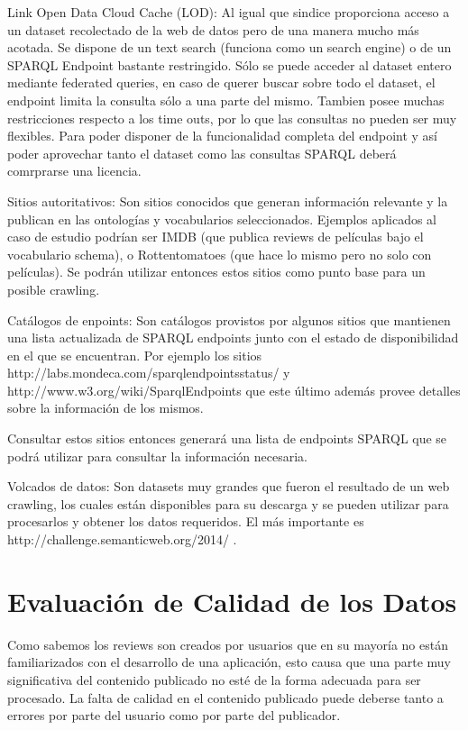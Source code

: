 Link Open Data Cloud Cache (LOD): Al igual que sindice proporciona acceso a un dataset recolectado de la web de datos pero de una manera mucho más acotada. Se dispone de un text search (funciona como un search engine) o de un SPARQL Endpoint bastante restringido. Sólo se puede acceder al dataset entero mediante federated queries, en caso de querer buscar sobre todo el dataset, el endpoint limita la consulta sólo a una parte del mismo. Tambien posee muchas restricciones respecto a los time outs, por lo que las consultas no pueden ser muy flexibles.
Para poder disponer de la funcionalidad completa del endpoint y así poder aprovechar tanto el dataset como las consultas SPARQL deberá comrprarse una licencia.

Sitios autoritativos: Son sitios conocidos que generan información relevante y la publican en las ontologías y vocabularios 
seleccionados. Ejemplos aplicados al caso de estudio podrían ser IMDB (que publica reviews de películas bajo el vocabulario schema), o Rottentomatoes
(que hace lo mismo pero no solo con películas). Se podrán utilizar entonces estos sitios como punto base para un posible crawling.

Catálogos de enpoints: Son catálogos provistos por algunos sitios que mantienen una lista actualizada de SPARQL endpoints 
junto con el estado de disponibilidad en el que se encuentran. Por ejemplo los sitios http://labs.mondeca.com/sparqlendpointsstatus/ y 
http://www.w3.org/wiki/SparqlEndpoints que este último además provee detalles sobre la información de los mismos.

Consultar estos sitios entonces generará una lista de endpoints SPARQL que se podrá utilizar para consultar la información necesaria.

Volcados de datos: Son datasets muy grandes que fueron el resultado de un web crawling, los cuales están disponibles para su descarga 
y se pueden utilizar para procesarlos y obtener los datos requeridos. El más importante es http://challenge.semanticweb.org/2014/ .



%

 

\section{Evaluación de Calidad de los Datos} 
Como sabemos los reviews son creados por usuarios que en su mayoría no están familiarizados con el desarrollo de una 
aplicación, esto causa que una parte muy significativa del contenido publicado no esté de la forma adecuada para ser procesado. 
La falta de calidad en el contenido publicado puede deberse tanto a errores por parte del usuario como por parte del publicador.


